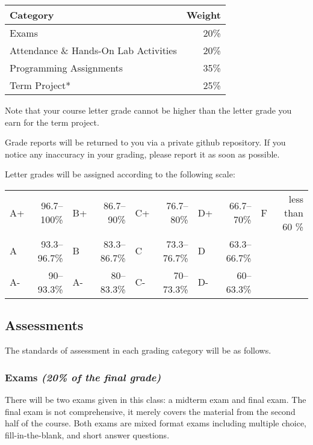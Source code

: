 \documentclass[11pt]{article}
\begin{document}
\begin{tabular}{|l|r|}
\hline
{\bf Category} & {\bf Weight}\\
\hline
Exams & 20\%\\
\hline
Attendance \& Hands-On Lab Activities & 20\% \\
\hline
Programming Assignments & 35\%\\
\hline
Term Project* & 25\% \\
\hline
\end{tabular}

{\footnotesize * Note that your course letter grade cannot be higher
than the letter grade you earn for the term project.}

\vspace{0.25in}

Grade reports will be returned to you via a private github
repository.  If you notice any inaccuracy in your grading, please
report it as soon as possible.  

\vspace{0.25in}

Letter grades will be assigned according to the following scale:

\begin{tabular}{|lr|lr|lr|lr|lr|}
    \hline
    A+ & 96.7--100\% & B+ & 86.7--90\% & C+ & 76.7--80\% & D+ & 66.7--70\% & F & less than 60 \% \\
    A  & 93.3--96.7\% & B & 83.3--86.7\% & C & 73.3--76.7\% & D & 63.3--66.7\% & & \\
    A- & 90--93.3\% & A- & 80--83.3\% & C- & 70--73.3\% & D- & 60--63.3\% & & \\
    \hline
\end{tabular}

\subsection*{Assessments}
The standards of assessment in each grading category will be as
follows.

\subsubsection*{Exams {\em (20\% of the final grade)}}
There will be two exams given in this class: a midterm exam and final
exam.  The final exam is not comprehensive, it merely covers the
material from the second half of the course. Both exams are mixed
format exams including multiple choice, fill-in-the-blank, and short
answer questions.
\end{document}
